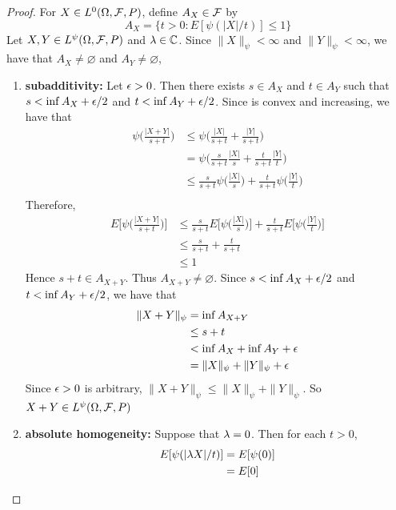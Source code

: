 \documentclass{book}
\begin{document}
	\begin{proof}
		For $X \in L^0(\Omega, \mathcal{F}, P)$, define $A_X \in \mathcal{F}$ by 
		$$A_X = \{t > 0 : E [\psi(|X|/t)] \leq 1\}$$
		Let $X, Y \in L^{\psi}(\Omega, \mathcal{F}, P)$ and $\lambda \in \mathbb{C}$. Since $\|X\|_{\psi} < \infty$ and $\|Y\|_{\psi} < \infty$, we have that $A_X \neq \varnothing$ and $A_Y \neq \varnothing$,
		\begin{enumerate}
			\item \textbf{subadditivity:} Let $\epsilon > 0$. Then there exists $s \in A_X$ and $t \in A_Y$ such that $s < \inf A_X + \epsilon/2$ and $t < \inf A_Y + \epsilon/2$. Since is convex and increasing, we have that
			\begin{align*}
				\psi \bigg( \frac{|X+Y|}{s +t} \bigg) 
				& \leq \psi \bigg( \frac{|X|}{s +t} +  \frac{|Y|}{s +t} \bigg) \\
				& = \psi \bigg( \frac{s}{s + t}\frac{|X|}{s} + \frac{t}{s + t}\frac{|Y|}{t} \bigg) \\
				& \leq \frac{s}{s + t} \psi \bigg( \frac{|X|}{s} \bigg) + \frac{t}{s + t} \psi \bigg( \frac{|Y|}{t} \bigg) \\
			\end{align*}
			Therefore, 
			\begin{align*}
				E\bigg[ \psi \bigg( \frac{|X+Y|}{s +t} \bigg)  \bigg]
				& \leq  \frac{s}{s + t} E \bigg[ \psi \bigg( \frac{|X|}{s} \bigg) \bigg] +  \frac{t}{s + t} E \bigg[ \psi \bigg( \frac{|Y|}{t} \bigg) \bigg] \\
				& \leq  \frac{s}{s + t} +  \frac{t}{s + t} \\
				& \leq 1
			\end{align*}
			Hence $s+t \in A_{X+Y}$. Thus $A_{X+Y} \neq \varnothing$. Since $s < \inf A_X + \epsilon/2$ and $t < \inf A_Y + \epsilon/2$, we have that 
			\begin{align*}
				\|X + Y\|_{\psi}
				& = \inf A_{X+Y} \\
				& \leq s + t \\ 
				& < \inf A_X + \inf A_Y + \epsilon \\
				& = \|X\|_{\psi} + \|Y \|_{\psi} + \epsilon
			\end{align*}
			Since $\epsilon >0$ is arbitrary, $	\|X + Y\|_{\psi} \leq \|X\|_{\psi} + \|Y \|_{\psi}$. So $X+Y \in L^{\psi}(\Omega, \mathcal{F}, P)$
			\item \textbf{absolute homogeneity:} Suppose that $\lambda = 0$. Then for each $t >0$, 
			\begin{align*}
				E [\psi(|\lam X|/t)] 
				& = E[\psi(0)]\\
				& = E[0] \\

\end{align*}
\end{enumerate}
\end{proof}
\end{document}
